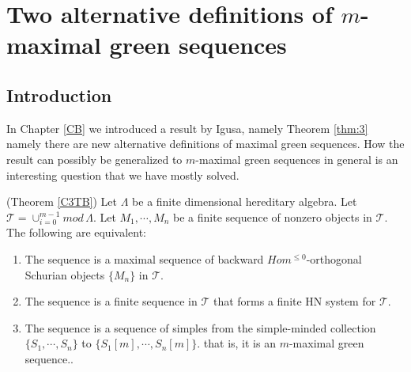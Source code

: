 \chapter{Two alternative definitions of $m$-maximal green sequences}\label{C3}
\section{Introduction}
\indent In Chapter \ref{CB} we introduced a result by Igusa, namely Theorem \ref{thm:3} namely there are new alternative definitions of maximal green sequences. How the result can possibly be generalized to $m$-maximal green sequences in general is an interesting question that we have mostly solved.\\
\begin{theorem}\label{C3T}
\indent (Theorem \ref{C3TB}) Let $\Lambda$ be a finite dimensional hereditary algebra. Let $\mathcal{T} = \cup_{i=0}^{m-1} mod\,\Lambda$. Let $M_1,\cdots, M_n$ be a finite sequence of nonzero objects in $\mathcal{T}$. The following are equivalent:
\begin{enumerate}
\item The sequence is a maximal sequence of backward $Hom^{\leq 0}$-orthogonal Schurian objects $\{M_n\}$ in $\mathcal{T}$.
\item The sequence is a finite sequence in $\mathcal{T}$ that forms a finite HN system for $\mathcal{T}$.
\item The sequence is a sequence of simples from the simple-minded collection $\{S_1,\cdots, S_n\}$ to  $\{S_1[m],\cdots, S_n[m]\}$. that is, it is an $m$-maximal green sequence..
\end{enumerate}
\end{theorem}

